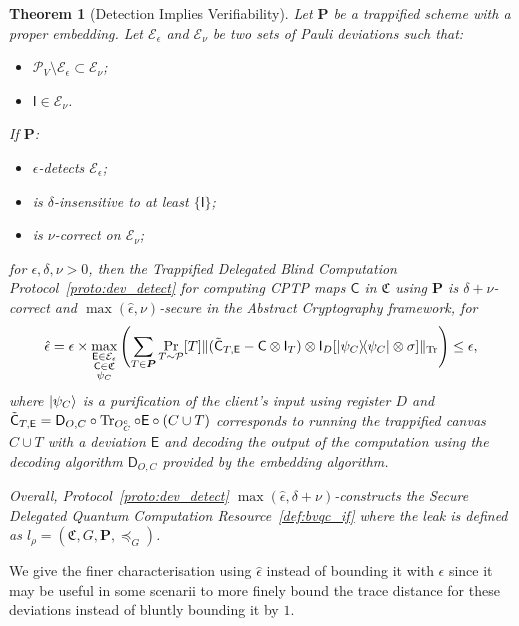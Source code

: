 \documentclass[12pt]{iopart}
\newcommand{\cptp}[1]{\mathsf{#1}} \newcommand{\pd}[1]{\mathcal{#1}}  \newcommand{\sch}[1]{\bm{#1}}
\newcommand{\Id}{\cptp{I}}
\renewcommand{\1}{\mathds{1}}
\newcommand{\TP}{C\cup T}
\newcommand{\Deco}{\cptp D_{O, C}}
\newcommand{\Cdev}[1]{\tilde{\cptp C}_{T, #1}}
\newtheorem{theorem}{Theorem}
\begin{document}
\begin{theorem}[Detection Implies Verifiability]
  \label{thm:verif}
  Let $\sch P$ be a trappified scheme with a proper embedding. Let $\mathcal E_\epsilon$ and $\mathcal E_\nu$ be two sets of Pauli deviations such that:
\begin{itemize}
\item $\mathcal P_V \setminus \mathcal E_\epsilon \subset \mathcal E_\nu$;
\item $\Id \in \mathcal{E}_\nu$.
\end{itemize}
If $\sch P$:
\begin{itemize}
\item $\epsilon$-detects $\mathcal E_\epsilon$;
\item is $\delta$-insensitive to at least $\{\Id\}$;
\item is $\nu$-correct on $\mathcal E_\nu$;
\end{itemize}
for $\epsilon, \delta, \nu > 0$, then the Trappified Delegated Blind Computation Protocol~\ref{proto:dev_detect} for computing CPTP maps $\cptp C$ in $\mathfrak C$ using $\sch P$ is $\delta + \nu$-correct and $\max(\hat{\epsilon}, \nu)$-secure in the Abstract Cryptography framework, for
\begin{equation}
\hat{\epsilon} = \epsilon \times \max_{\substack{\cptp E \in \mathcal E_\epsilon\\ \cptp C \in \mathfrak{C} \\ \psi_C}}\left(\sum_{T\in \sch P} \Pr_{T \sim \pd P}[T]\|(\Cdev{\cptp E}  - \cptp C\otimes \Id_T)\otimes\Id_D [\dyad{\psi_C} \otimes \sigma]\|_{\Tr}\right) \leq \epsilon,
\end{equation}
where $\ket{\psi_C}$ is a purification of the client's input using register $D$ and $\Cdev{\cptp E} = \Deco\circ\Tr_{O_C^c}\circ\cptp E\circ (\TP)$ corresponds to running the trappified canvas $\TP$ with a deviation $\cptp E$ and decoding the output of the computation using the decoding algorithm $\Deco$ provided by the embedding algorithm.

Overall, Protocol~\ref{proto:dev_detect} $\max(\hat{\epsilon}, \delta + \nu)$-constructs the Secure Delegated Quantum Computation Resource~\ref{def:bvqc_if} where the leak is defined as $l_{\rho} = (\mathfrak{C}, G, \sch P, \preceq_G)$.
\end{theorem}

We give the finer characterisation using $\hat{\epsilon}$ instead of bounding it with $\epsilon$ since it may be useful in some scenarii to more finely bound the trace distance for these deviations instead of bluntly bounding it by $1$.
\end{document}
